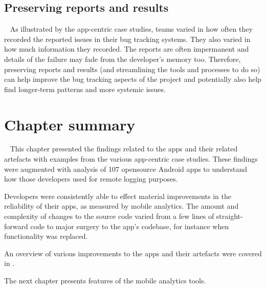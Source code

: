 
\subsection{Preserving reports and results}~\label{aata-preserving-reports-and-results}
As illustrated by the app-centric case studies, teams varied in how often they recorded the reported issues in their bug tracking systems. They also varied in how much information they recorded. The reports are often impermanent and details of the failure may fade from the developer's memory too. Therefore, preserving reports and results (and streamlining the tools and processes to do so) can help improve the bug tracking aspects of the project and potentially also help  find longer-term patterns and more systemic issues. 


\section{Chapter summary}~\label{aata-summary-section}
This chapter presented the findings related to the apps and their related artefacts with examples from the various app-centric case studies. These findings were augmented with analysis of 107 opensource Android apps to understand how those developers used  for remote logging purposes.

Developers were consistently able to effect material improvements in the reliability of their apps, as measured by mobile analytics. The amount and complexity of changes to the source code varied from a few lines of straight-forward code to major surgery to the app's codebase, for instance when functionality was replaced. 

An overview of various improvements to the apps and their artefacts were covered in .

The next chapter presents features of the mobile analytics tools. 
